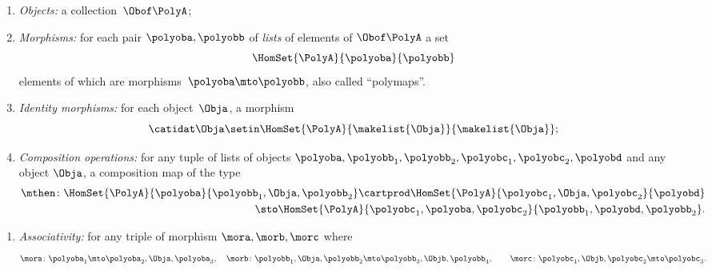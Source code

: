 \begin{ctdefinition}[Polycategory]
    \constit
    \begin{enumerate}
        \item \emph{Objects:} a collection~$\Obof\PolyA$;
        \item \emph{Morphisms:} for each pair $\polyoba, \polyobb$ of \emph{lists} of elements of $\Obof\PolyA$
              a set
              \begin{equation}
                  \HomSet{\PolyA}{\polyoba}{\polyobb}
              \end{equation}
              elements of which are morphisms~$\polyoba \mto \polyobb$,
              also called ``polymaps''.
        \item \emph{Identity morphisms:} for each object~$\Obja$, a morphism
              \begin{equation}
                  \catidat\Obja \setin \HomSet{\PolyA}{\makelist{\Obja}}{\makelist{\Obja}};
              \end{equation}
        \item \emph{Composition operations:} for any tuple of lists of objects
              $\polyoba, \polyobb_1, \polyobb_2, \polyobc_1, \polyobc_2, \polyobd$ and any object $\Obja$,
              a composition map of the type
              \begin{equation}
                  \begin{aligned}
                      \mthen \colon \HomSet{\PolyA}{\polyoba}{\polyobb_1,\Obja,\polyobb_2}
                      \cartprod
                      \HomSet{\PolyA}{\polyobc_1,\Obja,\polyobc_2}{\polyobd} \\
                      \sto
                      \HomSet{\PolyA}{\polyobc_1,\polyoba,\polyobc_2}{\polyobb_1,\polyobd,\polyobb_2}.
                  \end{aligned}
              \end{equation}
    \end{enumerate}
    \condit
    \begin{enumerate}
        \item \emph{Associativity:} for any triple of morphism $\mora,\morb,\morc$ where
              \begin{equation}
                  \mora \colon \polyoba_1 \mto \polyoba_2,\Obja,\polyoba_3,
                  \quad
                  \morb  \colon \polyobb_1 , \Obja,  \polyobb_2 \mto \polyobb_3, \Objb ,\polyobb_4,
                  \qquad
                  \morc \colon \polyobc_1 , \Objb ,  \polyobc_2 \mto \polyobc_3.
              \end{equation}

\end{enumerate}
\end{ctdefinition}
